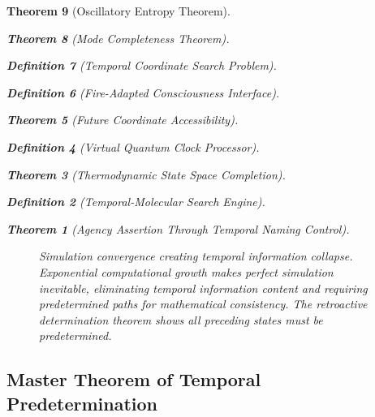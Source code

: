\documentclass[12pt,a4paper]{article}
\newtheorem{theorem}{Theorem}[section]
\newtheorem{definition}[theorem]{Definition}
\begin{document}
\begin{theorem}[Oscillatory Entropy Theorem]
\begin{theorem}[Mode Completeness Theorem]
\begin{enumerate}
\begin{definition}[Temporal Coordinate Search Problem]
\begin{algorithm}
\begin{definition}[Fire-Adapted Consciousness Interface]
\begin{theorem}[Future Coordinate Accessibility]
\begin{definition}[Virtual Quantum Clock Processor]
\begin{itemize}
\begin{itemize}
\begin{theorem}[Thermodynamic State Space Completion]
\begin{definition}[Temporal-Molecular Search Engine]
\begin{theorem}[Agency Assertion Through Temporal Naming Control]
\begin{remark}
\begin{figure}[h]
\caption{Simulation convergence creating temporal information collapse. Exponential computational growth makes perfect simulation inevitable, eliminating temporal information content and requiring predetermined paths for mathematical consistency. The retroactive determination theorem shows all preceding states must be predetermined.}
\label{fig:simulation_convergence}
\end{figure}

\subsection{Master Theorem of Temporal Predetermination}


\end{remark}
\end{theorem}
\end{definition}
\end{theorem}
\end{itemize}
\end{itemize}
\end{definition}
\end{theorem}
\end{definition}
\end{algorithm}
\end{definition}
\end{enumerate}
\end{theorem}
\end{theorem}
\end{document}
